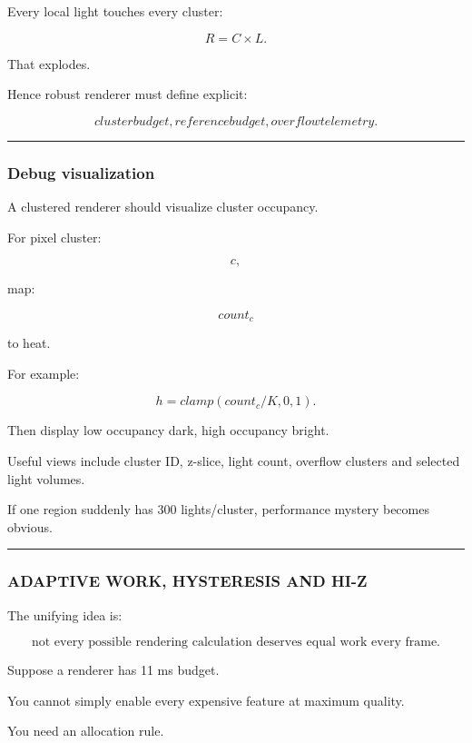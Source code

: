 Every local light touches every cluster:

\[
R=C\times L.
\]

That explodes.

Hence robust renderer must define explicit:

\[
\boxed{
cluster budget,
reference budget,
overflow telemetry.
}
\]

\begin{center}\rule{0.5\linewidth}{0.5pt}\end{center}

\subsubsection{Debug visualization}\label{debug-visualization}

A clustered renderer should visualize cluster occupancy.

For pixel cluster:

\[
c,
\]

map:

\[
count_c
\]

to heat.

For example:

\[
h=
clamp(
count_c/K,
0,1
).
\]

Then display low occupancy dark, high occupancy bright.

Useful views include cluster ID, z-slice, light count, overflow clusters and selected light volumes.

If one region suddenly has 300 lights/cluster, performance mystery becomes obvious.

\begin{center}\rule{0.5\linewidth}{0.5pt}\end{center}

\subsubsection{ADAPTIVE WORK, HYSTERESIS AND HI-Z}\label{adaptive-work-hysteresis-and-hi-z}

The unifying idea is:

\[
\boxed{
\text{not every possible rendering calculation deserves equal work every frame}.
}
\]

Suppose a renderer has 11 ms budget.

You cannot simply enable every expensive feature at maximum quality.

You need an allocation rule.

